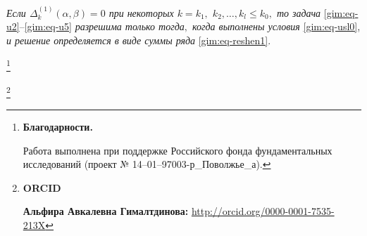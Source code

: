 {\it Если $\Delta_k^{(1)}(\alpha,\beta)=0$ при некоторых   $k=k_1,$  $k_2,\dots, k_l\le k_0,$ то задача} \eqref{gim:eq-u2}--\eqref{gim:eq-u5}  {\it разрешима только тогда$,$ когда выполнены условия } \eqref{gim:eq-usl0}, {\it и решение определяется в виде суммы ряда } \eqref{gim:eq-reshen1}.







\smallskip







\thanks{\textbf{Благодарности.}

Работа выполнена при поддержке Российского фонда фундаментальных исследований (проект № 14--01--97003-р\_Поволжье\_а).}





\thanks{{\bf ORCID}



{\bf Альфира Авкалевна Гималтдинова:}    \url{http://orcid.org/0000-0001-7535-213X}





}













\RusRef



